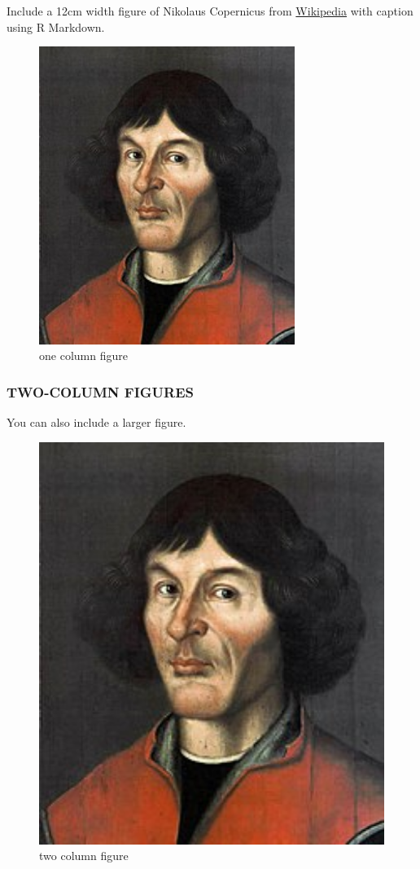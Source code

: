 \documentclass[, manuscript]{copernicus}
\begin{document}
Include a 12cm width figure of Nikolaus Copernicus from
\href{https://en.wikipedia.org/wiki/File:Nikolaus_Kopernikus.jpg}{Wikipedia}
with caption using R Markdown.

\begin{figure}
\includegraphics[width=8.3cm]{Nikolaus_Kopernikus} \caption{one column figure}\label{fig:unnamed-chunk-2}
\end{figure}

\subsubsection{TWO-COLUMN FIGURES}

You can also include a larger figure.

\begin{figure}
\includegraphics[width=12cm]{Nikolaus_Kopernikus} \caption{two column figure}\label{fig:unnamed-chunk-3}
\end{figure}
\end{document}
